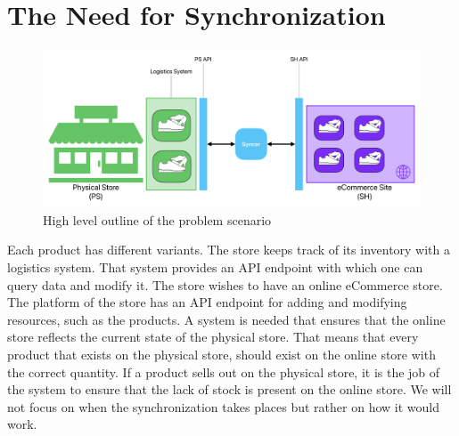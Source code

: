 \section{The Need for Synchronization}
\begin{figure}[h!]
    \centering
    \includegraphics[width=\textwidth]{media/communications.pdf}
    \caption{High level outline of the problem scenario}
    \label{fig:case_comms}
\end{figure}
 Each product has different variants. The store keeps track of its inventory with a logistics system. That system provides an API endpoint with which one can query data and modify it.
The store wishes to have an online eCommerce store. The platform of the store has an API endpoint for adding and modifying resources, such as the products.
A system is needed that ensures that the online store reflects the current state of the physical store. That means that every product that exists on the physical store, should exist on the online store with the correct quantity. If a product sells out on the physical store, it is the job of the system to ensure that the lack of stock is present on the online store.
We will not focus on when the synchronization takes places but rather on how it would work.
